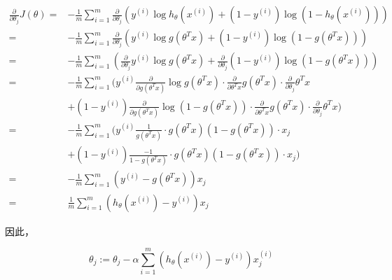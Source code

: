 \documentclass[12pt, a4paper]{article}
\begin{document}
\begin{align*}
    \frac{\partial}{\partial\theta_j}J(\theta) = & -\frac{1}{m}\sum_{i=1}^{m}\frac{\partial}{\partial\theta_j}(y^{(i)}\log h_\theta(x^{(i)})+(1-y^{(i)})\log(1-h_\theta(x^{(i)})))                                                             \\
    =                                            & -\frac{1}{m}\sum_{i=1}^{m}\frac{\partial}{\partial\theta_j}(y^{(i)}\log g(\theta^Tx)+(1-y^{(i)})\log(1-g(\theta^Tx)))                                                                       \\
    =                                            & -\frac{1}{m}\sum_{i=1}^{m}(\frac{\partial}{\partial\theta_j}y^{(i)}\log g(\theta^Tx) + \frac{\partial}{\partial\theta_j}(1-y^{(i)})\log(1-g(\theta^Tx)))                                    \\
    =                                            & -\frac{1}{m}\sum_{i=1}^{m}(y^{(i)}\frac{\partial}{\partial g(\theta^Tx)}\log g(\theta^Tx)\cdot\frac{\partial}{\partial\theta^Tx}g(\theta^Tx)\cdot\frac{\partial}{\partial\theta_j}\theta^Tx \\
                                                 & +(1-y^{(i)})\frac{\partial}{\partial g(\theta^Tx)}\log(1-g(\theta^Tx))\cdot\frac{\partial}{\partial\theta^Tx}g(\theta^Tx)\cdot\frac{\partial}{\partial\theta_j}\theta^Tx)                   \\
    =                                            & -\frac{1}{m}\sum_{i=1}^{m}(y^{(i)}\frac{1}{g(\theta^Tx)}\cdot g(\theta^Tx)(1-g(\theta^Tx))\cdot x_j                                                                                         \\
                                                 & +(1-y^{(i)})\frac{-1}{1-g(\theta^Tx)}\cdot g(\theta^Tx)(1-g(\theta^Tx))\cdot x_j)                                                                                                           \\
    =                                            & -\frac{1}{m}\sum_{i=1}^{m}(y^{(i)}-g(\theta^Tx))x_j                                                                                                                                         \\
    =                                            & \frac{1}{m}\sum_{i=1}^{m}(h_\theta(x^{(i)})-y^{(i)})x_j
\end{align*}

因此，

\begin{equation*}
    \theta_j:=\theta_j-\alpha\sum_{i=1}^{m}(h_\theta(x^{(i)})-y^{(i)})x_j^{(i)}
\end{equation*}
\end{document}
